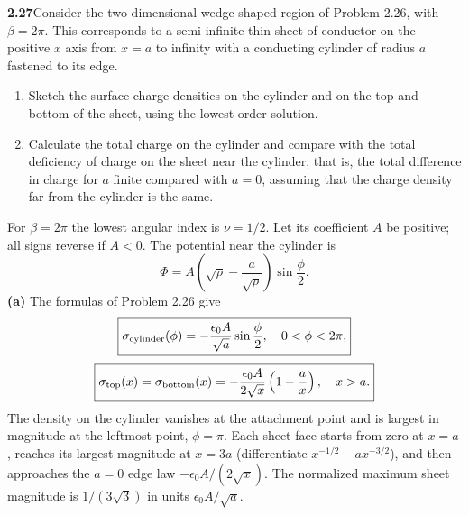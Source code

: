 \par\bigskip
\noindent\textbf{2.27}\quad Consider the two-dimensional wedge-shaped region of Problem 2.26, with $\beta=2\pi$. This corresponds to a semi-infinite thin sheet of conductor on the positive $x$ axis from $x=a$ to infinity with a conducting cylinder of radius $a$ fastened to its edge.
\begin{enumerate}
\item[(a)] Sketch the surface-charge densities on the cylinder and on the top and bottom of the sheet, using the lowest order solution.
\item[(b)] Calculate the total charge on the cylinder and compare with the total deficiency of charge on the sheet near the cylinder, that is, the total difference in charge for $a$ finite compared with $a=0$, assuming that the charge density far from the cylinder is the same.
\end{enumerate}
\solution
For $\beta=2\pi$ the lowest angular index is $\nu=1/2$.
Let its coefficient $A$ be positive; all signs reverse if $A<0$.
The potential near the cylinder is
\[
\Phi=A\left(\sqrt\rho-\frac a{\sqrt\rho}\right)\sin\frac\phi2.
\]
\textbf{(a)} The formulas of Problem 2.26 give
\[
\boxed{\sigma_{\rm cylinder}(\phi)=-\frac{\epsilon _0A}{\sqrt a}
                              \sin\frac\phi2,\quad0<\phi<2\pi,}
\]
\[
\boxed{\sigma_{\rm top}(x)=\sigma_{\rm bottom}(x)
 =-\frac{\epsilon _0A}{2\sqrt x}\left(1-\frac ax\right),\quad x>a.}
\]
The density on the cylinder vanishes at the attachment point and
is largest in magnitude at the leftmost point, $\phi=\pi$.
Each sheet face starts from zero at $x=a$, reaches its largest
magnitude at $x=3a$ (differentiate $x^{-1/2}-ax^{-3/2}$), and then
approaches the $a=0$ edge law $-\epsilon _0A/(2\sqrt x)$.
The normalized maximum sheet magnitude is $1/(3\sqrt3)$ in units
$\epsilon _0A/\sqrt a$.
\begin{center}
\end{center}
